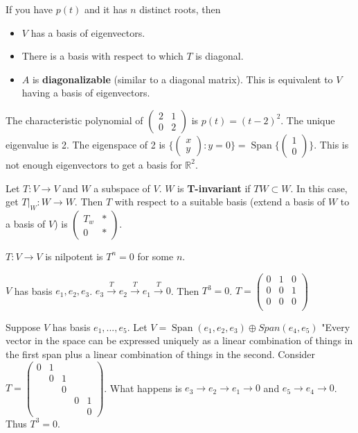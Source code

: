 \documentclass{article}
\newcommand{\vocab}[1]{\textbf{\color{blue!90}\boldmath #1}}
\newcommand{\R}{\mathbb{R}}
\newcommand{\ra}[1][]{\xrightarrow{#1}}
\DeclareMathOperator{\Span}{Span}
\begin{document}
\begin{corollary}
If you have $p(t)$ and it has $n$ distinct roots, then
\begin{itemize}
    \item $V$ has a basis of eigenvectors.
    \item There is a basis with respect to which $T$ is diagonal. 
    \item $A$ is \vocab{diagonalizable} (similar to a diagonal matrix). This is equivalent to $V$ having a basis of eigenvectors.
\end{itemize}
\end{corollary}
\begin{example}
The characteristic polynomial of $\begin{pmatrix}
2&1\\
0&2
\end{pmatrix}$ is $p(t)=(t-2)^2$. The unique eigenvalue is 2. The eigenspace of 2 is $\{\begin{pmatrix}
x\\y
\end{pmatrix}:y=0\}=\Span\{\begin{pmatrix}
1\\0 
\end{pmatrix}\}$. This is not enough eigenvectors to get a basis for $\R^2$.
\end{example}
\begin{definition}
Let $T:V\ra V$ and $W$ a subspace of $V$. $W$ is \vocab{T-invariant} if $TW\subset W$. In this case, get $T|_W:W\ra W$. Then $T$ with respect to a suitable basis (extend a basis of $W$ to a basis of $V$) is $\begin{pmatrix}
T_w&*\\
0&*
\end{pmatrix}$.
\end{definition}
\begin{definition}
$T:V\ra V$ is nilpotent is $T^n=0$ for some $n$. 
\end{definition}
\begin{example}
$V$ has basis $e_1,e_2,e_3$. $e_3\ra[T]e_2\ra[T]e_1\ra[T]0$. Then $T^3=0$. $T=\begin{pmatrix}
0&1&0\\
0&0&1\\
0&0&0\\
\end{pmatrix}$
\end{example}
\begin{example}
Suppose $V$ has basis $e_1,...,e_5$. Let $V=\Span(e_1,e_2,e_3)\oplus Span(e_4,e_5)$ "Every vector in the space can be expressed uniquely as a linear combination of things in the first span plus a linear combination of things in the second. Consider $T=\begin{pmatrix}
0&1&&&\\
&0&1&&\\
&&0&&\\
&&&0&1\\
&&&&0
\end{pmatrix}$. What happens is $e_3\ra e_2\ra e_1\ra 0$ and $e_5\ra e_4\ra 0$. Thus $T^3=0$.
\end{example}
\end{document}
